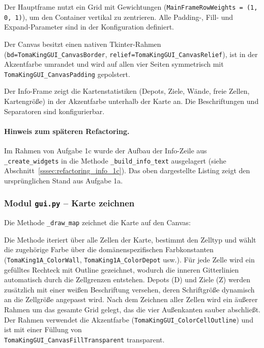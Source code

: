 Der Hauptframe nutzt ein Grid mit Gewichtungen (\texttt{MainFrameRowWeights = (1, 0, 1)}), um den Container vertikal zu zentrieren. Alle Padding-, Fill- und Expand-Parameter sind in der Konfiguration definiert.



Der Canvas besitzt einen nativen Tkinter-Rahmen (\texttt{bd=TomaKingGUI\_CanvasBorder}, \texttt{relief=TomaKingGUI\_CanvasRelief}), ist in der Akzentfarbe umrandet und wird auf allen vier Seiten symmetrisch mit \texttt{TomaKingGUI\_CanvasPadding} gepolstert.



Der Info-Frame zeigt die Kartenstatistiken (Depots, Ziele, Wände, freie Zellen, Kartengröße) in der Akzentfarbe unterhalb der Karte an. Die Beschriftungen und Separatoren sind konfigurierbar.

\paragraph{Hinweis zum späteren Refactoring.}
Im Rahmen von Aufgabe 1c wurde der Aufbau der Info-Zeile aus \texttt{\_create\_widgets} in die Methode \texttt{\_build\_info\_text} ausgelagert (siehe Abschnitt~\ref{sssec:refactoring_info_1c}). Das oben dargestellte Listing zeigt den ursprünglichen Stand aus Aufgabe 1a.


\subsubsection{Modul \texttt{gui.py} – Karte zeichnen}

Die Methode \texttt{\_draw\_map} zeichnet die Karte auf den Canvas:



Die Methode iteriert über alle Zellen der Karte, bestimmt den Zelltyp und wählt die zugehörige Farbe über die domänenspezifischen Farbkonstanten (\texttt{TomaKing1A\_ColorWall}, \texttt{TomaKing1A\_ColorDepot} usw.). Für jede Zelle wird ein gefülltes Rechteck mit Outline gezeichnet, wodurch die inneren Gitterlinien automatisch durch die Zellgrenzen entstehen. Depots (\acs{D}) und Ziele (\acs{Z}) werden zusätzlich mit einer weißen Beschriftung versehen, deren Schriftgröße dynamisch an die Zellgröße angepasst wird. Nach dem Zeichnen aller Zellen wird ein äußerer Rahmen um das gesamte Grid gelegt, das die vier Außenkanten sauber abschließt. Der Rahmen verwendet die Akzentfarbe (\texttt{TomaKingGUI\_ColorCellOutline}) und ist mit einer Füllung von \\ \texttt{TomaKingGUI\_CanvasFillTransparent} transparent.

